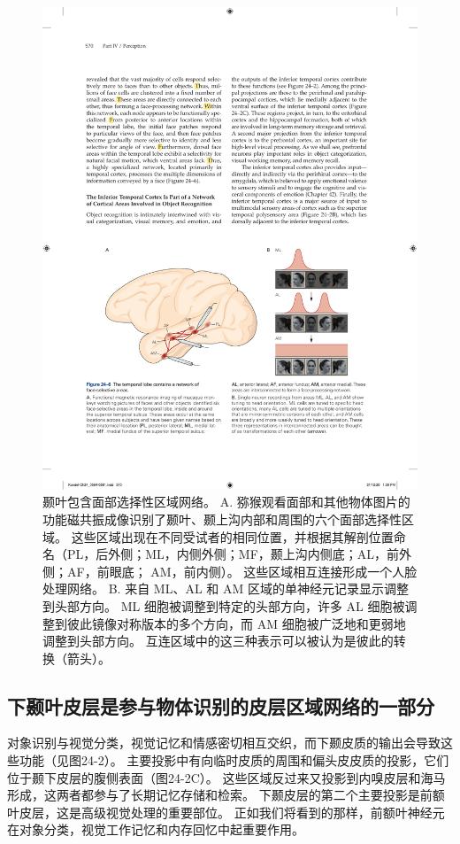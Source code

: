 \begin{figure}[htbp]
	\centering
	\includegraphics[width=0.9\linewidth]{chap24/fig_24_6}
	\caption{颞叶包含面部选择性区域网络。 A. 猕猴观看面部和其他物体图片的功能磁共振成像识别了颞叶、颞上沟内部和周围的六个面部选择性区域。 这些区域出现在不同受试者的相同位置，并根据其解剖位置命名（PL，后外侧；ML，内侧外侧；MF，颞上沟内侧底；AL，前外侧；AF，前眼底； AM，前内侧）。 这些区域相互连接形成一个人脸处理网络。 B. 来自 ML、AL 和 AM 区域的单神经元记录显示调整到头部方向。 ML 细胞被调整到特定的头部方向，许多 AL 细胞被调整到彼此镜像对称版本的多个方向，而 AM 细胞被广泛地和更弱地调整到头部方向。 互连区域中的这三种表示可以被认为是彼此的转换（箭头）。}
	\label{fig:24_6}
\end{figure}

\subsection{下颞叶皮层是参与物体识别的皮层区域网络的一部分}

对象识别与视觉分类，视觉记忆和情感密切相互交织，而下颞皮质的输出会导致这些功能（见图24-2）。 
主要投影中有向临时皮质的周围和偏头皮皮质的投影，它们位于颞下皮层的腹侧表面（图24-2C）。 
这些区域反过来又投影到内嗅皮层和海马形成，这两者都参与了长期记忆存储和检索。 
下颞皮层的第二个主要投影是前额叶皮层，这是高级视觉处理的重要部位。 
正如我们将看到的那样，前额叶神经元在对象分类，视觉工作记忆和内存回忆中起重要作用。


